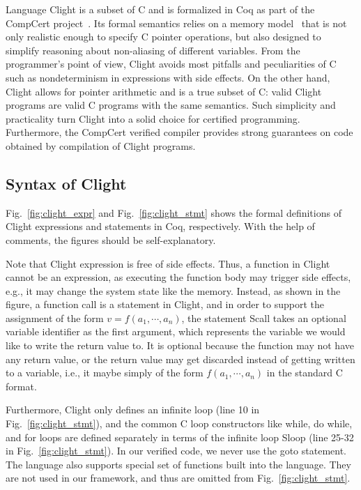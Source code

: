 Language Clight is a subset of C and is
formalized in Coq as part of the CompCert project~\cite{compcert}.  Its formal
semantics relies on a memory model~\cite{leroy08} that is not only
realistic enough to specify C pointer operations, but also designed to
simplify reasoning about non-aliasing of different variables.
From the programmer's point of view, 
Clight avoids most pitfalls and peculiarities of C such
as nondeterminism in expressions with side effects. 
On the other hand,
Clight allows for pointer arithmetic and is a true subset of C: valid
Clight programs are valid C programs with the same semantics.
Such simplicity and practicality turn Clight into a solid choice for
certified programming.
Furthermore, the CompCert verified compiler
provides strong guarantees on code
obtained by compilation of Clight programs.

\subsection{Syntax of Clight}

Fig.~\ref{fig:clight_expr} and Fig.~\ref{fig:clight_stmt} shows the formal
definitions of Clight expressions and statements in Coq, respectively.
With the help of comments, the figures should be self-explanatory.

Note that Clight expression is free of side effects. Thus, a function
in Clight cannot be an expression, as executing the function body
may trigger side effects, e.g., it may change the system state like the memory.
Instead, as shown in the figure, a function call is a statement in Clight,
and in order to support the assignment of the form $v = f(a_1, \cdots, a_n)$, the
statement \textsf{Scall} takes an optional variable identifier as the first  argument,
which represents the variable we would like to write the return value to.
It is optional because the function may not have any return value, or the return
value may get discarded instead of getting written to a variable, i.e.,
it maybe simply of the form $f(a_1, \cdots, a_n)$ in the standard C format.

Furthermore, Clight only defines an infinite loop
(line 10 in Fig.~\ref{fig:clight_stmt}), and the common C loop constructors
like \textsf{while}, \textsf{do while}, and \textsf{for} loops are defined
separately in terms of the infinite loop \textsf{Sloop} (line 25-32
in Fig.~\ref{fig:clight_stmt}). 
In our verified code, we never use
the \textsf{goto} statement.
The language also supports special set of functions built into the language.
They are not used in our framework, and thus are omitted from Fig.~\ref{fig:clight_stmt}.

